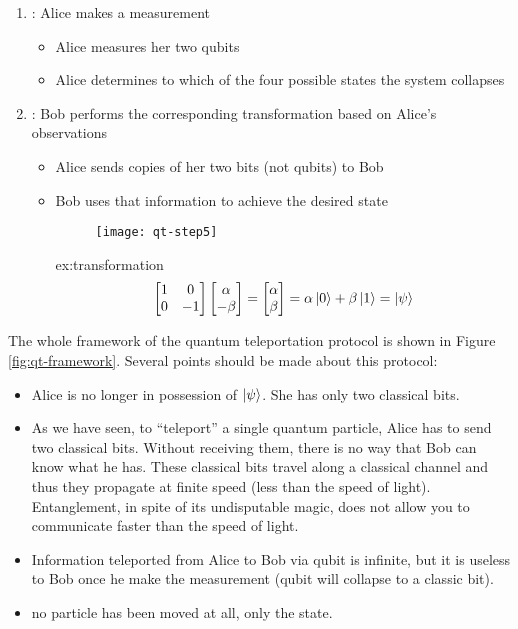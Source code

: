 \documentclass{easyclass}
\begin{document}
\begin{enumerate}
	\item : Alice makes a measurement
	\begin{itemize}
		\item Alice measures her two qubits
		\item Alice determines to which of the four possible states the system collapses
	\end{itemize}

	\item : Bob performs the corresponding transformation based on Alice's observations
	\begin{itemize}
		\item Alice sends copies of her two bits (not qubits) to Bob 
		\item Bob uses that information to achieve the desired state 
		\begin{figure}[h]
			\centering
			\texttt{[image: qt-step5]}
			\label{fig:qt-step5}
		\end{figure}
		
		\begin{example}{ex:transformation}
			\begin{equation}
				\begin{bmatrix}
					1 & 0 \\
					0 & -1
				\end{bmatrix}
				\begin{bmatrix}
					\alpha\\-\beta
				\end{bmatrix}=
				\begin{bmatrix}
					\alpha\\\beta
				\end{bmatrix}=\alpha\ket{0}+\beta\ket{1}=\ket{\psi}
			\end{equation} 
		\end{example}
	\end{itemize}
\end{enumerate}

The whole framework of the quantum teleportation protocol is shown in Figure \ref{fig:qt-framework}. Several points should be made about this protocol:
\begin{itemize}
	\item Alice is no longer in possession of $\ket{\psi}$. She has only two classical bits.
	\item As we have seen, to “teleport” a single quantum particle, Alice has to send two classical bits. Without receiving them, there is no way that Bob can know what he has. These classical bits travel along a classical channel and thus they propagate at finite speed (less than the speed of light). Entanglement, in spite of its undisputable magic, does not allow you to communicate faster than the speed of light. 
	\item Information teleported from Alice to Bob via qubit is infinite, but it is useless to Bob once he make the measurement (qubit will collapse to a classic bit).
	\item no particle has been moved at all, only the state.	
\end{itemize}
\end{document}
